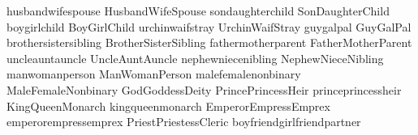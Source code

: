 \mfornb{\spouse}	{husband}{wife}{spouse}
\mfornb{\Spouse}	{Husband}{Wife}{Spouse}
\mfornb{\offspring}	{son}{daughter}{child}
\mfornb{\Offspring}	{Son}{Daughter}{Child}
\mfornb{\child}		{boy}{girl}{child}
\mfornb{\Child}		{Boy}{Girl}{Child}
\mfornb{\stray}	{urchin}{waif}{stray}
\mfornb{\Stray}	{Urchin}{Waif}{Stray}
\mfornb{\pal}		{guy}{gal}{pal}
\mfornb{\Pal}		{Guy}{Gal}{Pal}
\mfornb{\sibling}	{brother}{sister}{sibling}
\mfornb{\Sibling}	{Brother}{Sister}{Sibling}
\mfornb{\parent}	{father}{mother}{parent}
\mfornb{\Parent}	{Father}{Mother}{Parent}
\mfornb{\auncle}	{uncle}{aunt}{auncle}
\mfornb{\Auncle}	{Uncle}{Aunt}{Auncle}
\mfornb{\nibling}	{nephew}{niece}{nibling}
\mfornb{\Nibling}	{Nephew}{Niece}{Nibling}
\mfornb{\person}	{man}{woman}{person} %
\mfornb{\Person}	{Man}{Woman}{Person}
\mfornb{\sex}		{male}{female}{nonbinary}
\mfornb{\Sex}		{Male}{Female}{Nonbinary}
\mfornb{\Deity}		{God}{Goddess}{Deity}
\def\God\Deity
\mfornb{\Heir}		{Prince}{Princess}{Heir}
\mfornb{\heir}		{prince}{princess}{heir}
\mfornb{\Monarch}		{King}{Queen}{Monarch}
\mfornb{\monarch}		{king}{queen}{monarch}
\mfornb{\Emperor}		{Emperor}{Empress}{Emprex}
\mfornb{\emperor}		{emperor}{empress}{emprex}
\mfornb{\cleric}		{Priest}{Priestess}{Cleric}
\mfornb{\partner}	{boyfriend}{girlfriend}{partner}





